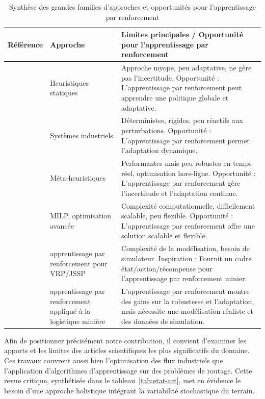 \documentclass[11pt,a4paper]{report}
\begin{document}
\begin{table}[H]
\centering
\caption{Synthèse des grandes familles d’approches et opportunités pour l’apprentissage par renforcement}
\label{tab:familles-approches}
\begin{tabularx}{\textwidth}{>{\raggedright\arraybackslash}p{} >{\raggedright\arraybackslash}p{} >{\raggedright\arraybackslash}X}
\toprule
\textbf{Référence} & \textbf{Approche} & \textbf{Limites principales / Opportunité pour l’apprentissage par renforcement} \\
\midrule
\cite{Alarie2002} & Heuristiques statiques & Approche myope, peu adaptative, ne gère pas l’incertitude. Opportunité : L’apprentissage par renforcement peut apprendre une politique globale et adaptative. \\[4pt]
\cite{Afrapoli2017, MehrnazMohtasham2023} & Systèmes industriels & Déterministes, rigides, peu réactifs aux perturbations. Opportunité : L’apprentissage par renforcement permet l’adaptation dynamique. \\[4pt]
\cite{MJFSouza2010, Subtil2011} & Méta-heuristiques & Performantes mais peu robustes en temps réel, optimisation hors-ligne. Opportunité : L’apprentissage par renforcement gère l’incertitude et l’adaptation continue. \\[4pt]
\cite{Ahangaran2012, AmandaSmith2020} & MILP, optimisation avancée & Complexité computationnelle, difficilement scalable, peu flexible. Opportunité : L’apprentissage par renforcement offre une solution scalable et flexible. \\[4pt]
\cite{MohammadrezaNazari2018, CongZhang2020} & apprentissage par renforcement pour VRP/JSSP & Complexité de la modélisation, besoin de simulateur. Inspiration : Fournit un cadre état/action/récompense pour l’apprentissage par renforcement minier. \\[4pt]
\cite{WZeng2022, MiladAbolghasemian2020} & apprentissage par renforcement appliqué à la logistique minière & L’apprentissage par renforcement montre des gains sur la robustesse et l’adaptation, mais nécessite une modélisation réaliste et des données de simulation. \\
\bottomrule
\end{tabularx}
\end{table}


Afin de positionner précisément notre contribution, il convient d'examiner les apports et les limites des articles scientifiques les plus significatifs du domaine. Ces travaux couvrent aussi bien l'optimisation des flux industriels que l'application d'algorithmes d'apprentissage sur des problèmes de routage. Cette revue critique, synthétisée dans le tableau~\ref{tab:etat-art}, met en évidence le besoin d'une approche holistique intégrant la variabilité stochastique du terrain.
\end{document}
